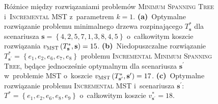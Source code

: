\begin{figure}[!htbp]
\begin{subfigure}[b]{0.3\textwidth}
		\caption{}
		\label{fig:increxample:c}
	\end{subfigure}
	\hfill\null
	\caption{
		Różnice między rozwiązaniami problemów \textsc{Minimum Spanning Tree} i~\textsc{Incremental MST} z~parametrem $k = 1$.
		\textbf{(a)}~Optymalne rozwiązanie problemu minimalnego drzewa rozpinającego $T^{\ast}_{\textbf{s}}$ dla scenariusza $\textbf{s} = \left\{ 4, 2, 5, 7, 1, 3, 8, 4, 5 \right\}$ o~całkowitym koszcie rozwiązania $v_{\textsc{MST}} \left( T^{\ast}_{\textbf{s}}, \textbf{s} \right) = 15$.	
		\textbf{(b)}~Niedopuszczalne rozwiązanie $T^{\ast}_{\textbf{s}^{\prime}} = \left\{ e_{1}, e_{2}, e_{6}, e_{7}, e_{8} \right\}$ problemu \textsc{Incremental Minimum Spanning Tree}, będące jednocześnie optymalnym dla scenariusza $\textbf{s}^{\prime}$ w~problemie \textsc{MST} o~koszcie $v_{\textsc{MST}} \left( T^{\ast}_{\textbf{s}^{\prime}}, \textbf{s}^{\prime} \right) = 17$.
		\textbf{(c)}~Optymalne rozwiązanie problemu \textsc{Incremental MST} i~scenariusza $\textbf{s}^{\prime}$: $T^{\ast} = \left\{ e_{1}, e_{2}, e_{6}, e_{8}, e_{9} \right\}$ o~całkowitym koszcie $v^{\ast}_{\textbf{s}^{\prime}} = 18$.
	}
	\label{fig:increxample}
\end{figure}

